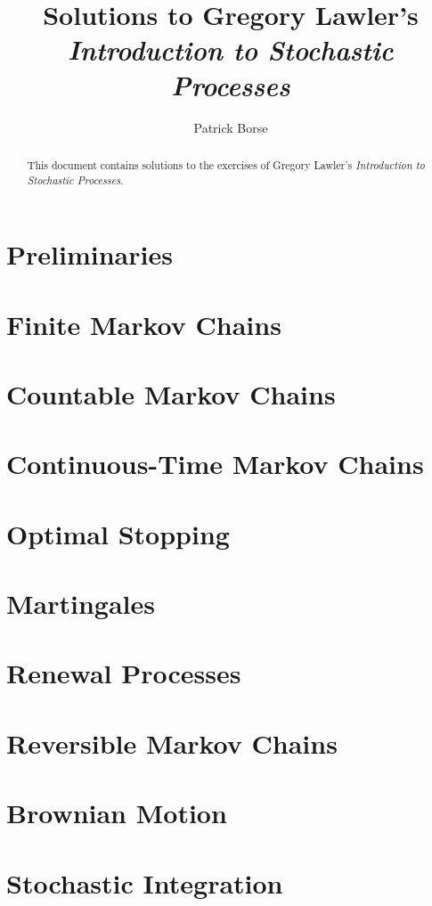 \documentclass[oneside]{amsbook}
\title{Solutions to Gregory Lawler's\\ \emph{Introduction to Stochastic Processes}}
\author{Patrick Borse}
\numberwithin{ex}{chapter}
\begin{document}
\begin{abstract}
This document contains solutions to the exercises of Gregory Lawler's \emph{Introduction to Stochastic Processes}.
\end{abstract}

\maketitle

\tableofcontents

\setcounter{chapter}{-1}
\chapter{Preliminaries}


\chapter{Finite Markov Chains}


\chapter{Countable Markov Chains}


\chapter{Continuous-Time Markov Chains}


\chapter{Optimal Stopping}


\chapter{Martingales}


\chapter{Renewal Processes}


\chapter{Reversible Markov Chains}


\chapter{Brownian Motion}


\chapter{Stochastic Integration}

\end{document}
